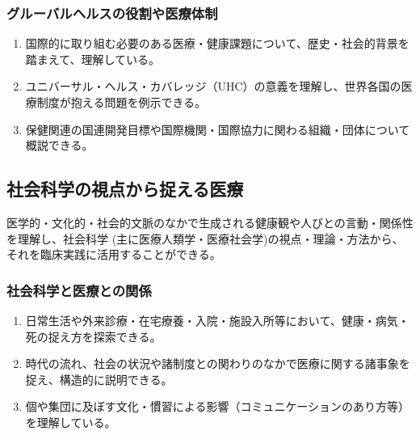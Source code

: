 \hypertarget{ux30b0ux30ebux30fcux30d0ux30ebux30d8ux30ebux30b9ux306eux5f79ux5272ux3084ux533bux7642ux4f53ux5236}{%
\subsubsection{グルーバルヘルスの役割や医療体制}\label{ux30b0ux30ebux30fcux30d0ux30ebux30d8ux30ebux30b9ux306eux5f79ux5272ux3084ux533bux7642ux4f53ux5236}}

\begin{enumerate}
\def\labelenumi{\arabic{enumi}.}
\tightlist
\item
  国際的に取り組む必要のある医療・健康課題について、歴史・社会的背景を踏まえて、理解している。
\item
  ユニバーサル・ヘルス・カバレッジ（UHC）の意義を理解し、世界各国の医療制度が抱える問題を例示できる。
\item
  保健関連の国連開発目標や国際機関・国際協力に関わる組織・団体について概説できる。
\end{enumerate}

\hypertarget{ux793eux4f1aux79d1ux5b66ux306eux8996ux70b9ux304bux3089ux6349ux3048ux308bux533bux7642}{%
\subsection{社会科学の視点から捉える医療}\label{ux793eux4f1aux79d1ux5b66ux306eux8996ux70b9ux304bux3089ux6349ux3048ux308bux533bux7642}}

医学的・文化的・社会的文脈のなかで生成される健康観や人びとの言動・関係性を理解し、社会科学
(主に医療人類学・医療社会学)の視点・理論・方法から、それを臨床実践に活用することができる。

\hypertarget{ux793eux4f1aux79d1ux5b66ux3068ux533bux7642ux3068ux306eux95a2ux4fc2}{%
\subsubsection{社会科学と医療との関係}\label{ux793eux4f1aux79d1ux5b66ux3068ux533bux7642ux3068ux306eux95a2ux4fc2}}

\begin{enumerate}
\def\labelenumi{\arabic{enumi}.}
\tightlist
\item
  日常生活や外来診療・在宅療養・入院・施設入所等において、健康・病気・死の捉え方を探索できる。
\item
  時代の流れ、社会の状況や諸制度との関わりのなかで医療に関する諸事象を捉え、構造的に説明できる。
\item
  個や集団に及ぼす文化・慣習による影響（コミュニケーションのあり方等）を理解している。
  \newpage
\end{enumerate}

